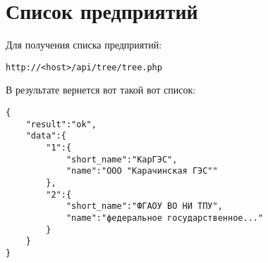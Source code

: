 \section{Список предприятий}
\par
Для получения списка предприятий: \\
\begin{Verbatim}[frame=single]
http://<host>/api/tree/tree.php
\end{Verbatim}

В результате вернется вот такой вот список:
\begin{Verbatim}[frame=single]
{
    "result":"ok",
    "data":{
        "1":{
            "short_name":"КарГЭС",
            "name":"ООО "Карачинская ГЭС""
        },
        "2":{
            "short_name":"ФГАОУ ВО НИ ТПУ",
            "name":"федеральное государственное..."
        }
    }
}
\end{Verbatim}